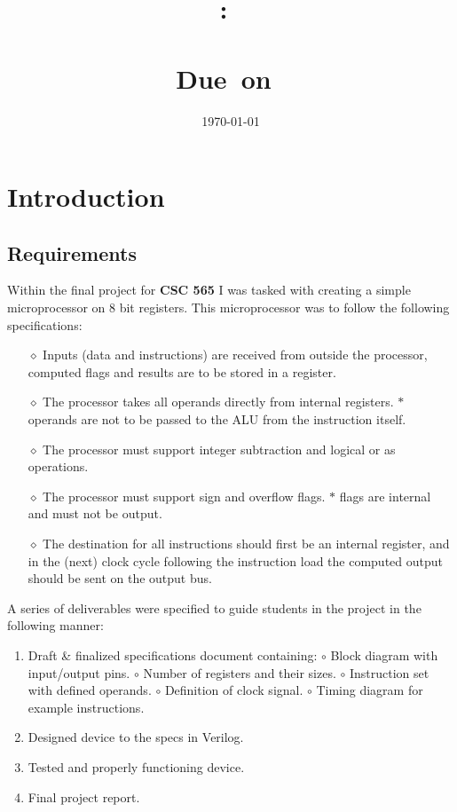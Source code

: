 \documentclass{article}
\title{
    \vspace{2in}
    \textmd{\textbf{\hmwkClass:\ \\ \hmwkTitle}}\\
    \normalsize\vspace{0.1in}\small{Due\ on\ \hmwkDueDate}\\
    \vspace{0.1in}\Large{\textit{\paprTitle}}
    \vspace{3in}
}
\author{\hmwkAuthorName}
\date{\today}
\begin{document}
\maketitle

\pagebreak

\tableofcontents
\listoftables
\listoffigures

\newpage

\section{Introduction}

\subsection{Requirements}
Within the final project for \textbf{CSC 565} I was tasked with creating a simple microprocessor on 8 bit registers. 
This microprocessor was to follow the following specifications:
\begin{itemize}
    \item[\(\diamond\)] Inputs (data and instructions) are received from outside the processor, computed flags and results are to be stored in a register.
    \item[\(\diamond\)] The processor takes all operands directly from internal registers.
    \subitem \(\ast\) operands are not to be passed to the ALU from the instruction itself.  
    \item[\(\diamond\)] The processor must support integer subtraction and logical or as operations. 
    \item[\(\diamond\)] The processor must support sign and overflow flags.
    \subitem \(\ast\) flags are internal and must not be output. 
    \item[\(\diamond\)] The destination for all instructions should first be an internal register, and in the (next) clock cycle following the instruction load the computed output should be sent on the output bus.
\end{itemize}

\noindent
A series of deliverables were specified to guide students in the project in the following manner:
\begin{enumerate}
    \item Draft \& finalized specifications document containing:
    \subitem \(\circ\) Block diagram with input/output pins.
    \subitem \(\circ\) Number of registers and their sizes.
    \subitem \(\circ\) Instruction set with defined operands.
    \subitem \(\circ\) Definition of clock signal.
    \subitem \(\circ\) Timing diagram for example instructions.
    \item Designed device to the specs in Verilog.
    \item Tested and properly functioning device.
    \item Final project report.
\end{enumerate}
\end{document}
